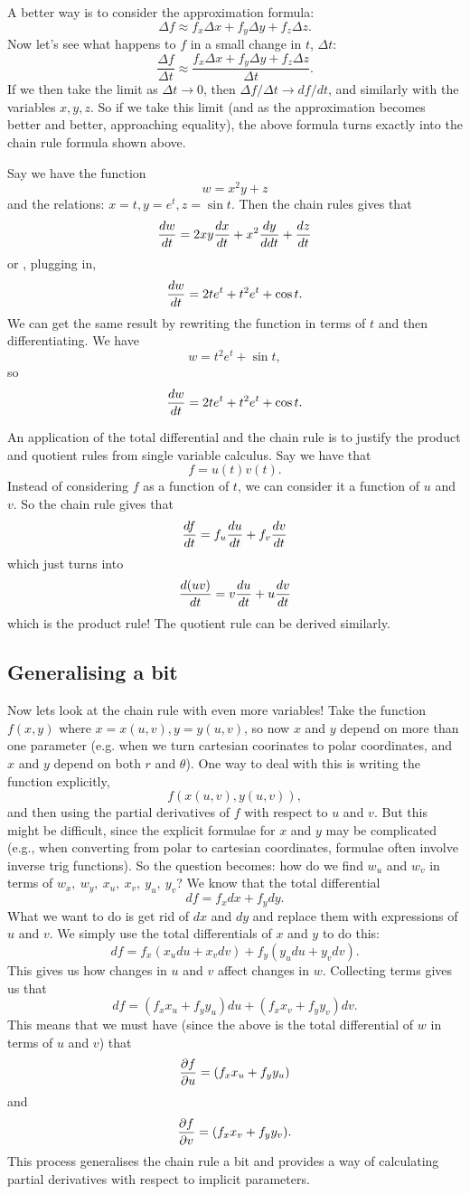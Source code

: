 A better way is to consider the approximation formula:
\[ \Delta f \approx f_x \Delta x + f_y \Delta y + f_z \Delta z. \]
Now let's see what happens to $f$ in a small change in $t$, $\Delta t$:
\[ \frac{\Delta f}{\Delta t} \approx \frac{f_x \Delta x + f_y \Delta y + f_z \Delta z}{\Delta t}. \]
If we then take the limit as $\Delta t \to 0$, then $\Delta f / \Delta t \to df/dt$, and similarly with the variables $x,y,z$. So if we take this limit (and as the approximation becomes better and better, approaching equality), the above formula turns exactly into the chain rule formula shown above.

\bex
Say we have the function 
\[ w = x^2y + z \]
and the relations: $x=t,y=e^t,z=\sin t$. Then the chain rules gives that 
\[ \frac{dw}{dt} = 2xy \frac{dx}{dt} + x^2 \frac{dy}{ddt} + \frac{dz}{dt} \]
or , plugging in,
\[ \frac{dw}{dt} = 2te^t  + t^2 e^t + \cos t. \]
We can get the same result by rewriting the function in terms of $t$ and then differentiating. We have
\[ w = t^2e^t + \sin t, \]
so 
\[ \frac{dw}{dt} = 2te^t + t^2e^t + \cos t. \]
\eex

An application of the total differential and the chain rule is to justify the product and quotient rules from single variable calculus. Say we have that
\[ f = u(t)v(t). \]
Instead of considering $f$ as a function of $t$, we can consider it a function of $u$ and $v$. So the chain rule gives that 
\[ \frac{df}{dt} = f_u \frac{du}{dt} + f_v \frac{dv}{dt} \]
which just turns into
\[ \frac{d(uv)}{dt} = v \frac{du}{dt} + u \frac{dv}{dt} \]
which is the product rule! The quotient rule can be derived similarly.

\subsection{Generalising a bit}
Now lets look at the chain rule with even more variables! Take the function $f(x,y)$ where $x = x(u,v),y=y(u,v)$, so now $x$ and $y$ depend on more than one parameter (e.g. when we turn cartesian coorinates to polar coordinates, and $x$ and $y$ depend on both $r$ and $\theta$). One way to deal with this is writing the function explicitly,
\[ f(x(u,v),y(u,v)), \]
and then using the partial derivatives of $f$ with respect to $u$ and $v$. But this might be difficult, since the explicit formulae for $x$ and $y$ may be complicated (e.g., when converting from polar to cartesian coordinates, formulae often involve inverse trig functions). So the question becomes: how do we find $w_u$ and $w_v$ in terms of $w_x,\ w_y,\ x_u,\ x_v,\ y_u,\ y_v$? We know that the total differential
\[ df = f_x dx + f_y dy. \]
What we want to do is get rid of $dx$ and $dy$ and replace them with expressions of $u$ and $v$. We simply use the total differentials of $x$ and $y$ to do this:
\[ df = f_x(x_u du + x_v dv) + f_y(y_u du + y_v dv). \]
This gives us how changes in $u$ and $v$ affect changes in $w$. Collecting terms gives us that
\[ df = (f_x  x_u + f_y y_u)du + (f_x x_v + f_y y_v) dv. \]
This means that we must have (since the above is the total differential of $w$ in terms of $u$ and $v$) that 
\[ \frac{\partial f}{\partial u} = (f_x  x_u + f_y y_u) \]
and 
\[ \frac{\partial f}{\partial v} =  (f_x x_v + f_y y_v). \]
This process generalises the chain rule a bit and provides a way of calculating partial derivatives with respect to implicit parameters.


